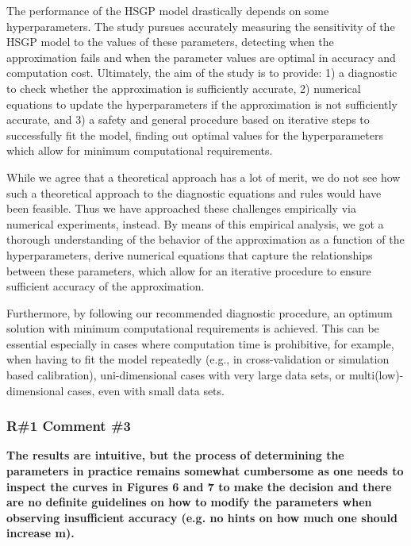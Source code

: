 \documentclass[11pt]{report}
\begin{document}
The performance of the HSGP model drastically depends on some hyperparameters. The study pursues accurately measuring the sensitivity of the HSGP model to the values of these parameters, detecting when the approximation fails and when the parameter values are optimal in accuracy and computation cost. Ultimately, the aim of the study is to provide: 1) a diagnostic to check whether the approximation is sufficiently accurate, 2) numerical equations to update the hyperparameters if the approximation is not sufficiently accurate, and 3) a safety and general procedure based on iterative steps to successfully fit the model, finding out optimal values for the hyperparameters which allow for minimum computational requirements.

While we agree that a theoretical approach has a lot of merit, we do not see how such a theoretical approach to the diagnostic equations and rules would have been feasible. Thus we have approached these challenges empirically via numerical experiments, instead. By means of this empirical analysis, we got a thorough understanding of the behavior of the approximation as a function of the hyperparameters, derive numerical equations that capture the relationships between these parameters, which allow for an iterative procedure to ensure sufficient accuracy of the approximation.

Furthermore, by following our recommended diagnostic procedure, an optimum solution with minimum computational requirements is achieved. This can be essential especially in cases where computation time is prohibitive, for example, when having to fit the model repeatedly (e.g., in cross-validation or simulation based calibration), uni-dimensional cases with very large data sets, or multi(low)-dimensional cases, even with small data sets. 


\subsubsection*{R\#1 Comment \#3}

\textbf{The results are intuitive, but the process of determining the parameters in practice remains somewhat cumbersome as one needs to inspect the curves in Figures 6 and 7 to make the decision and there are no definite guidelines on how to modify the parameters when observing insufficient accuracy (e.g. no hints on how much one should increase m).}
\end{document}
